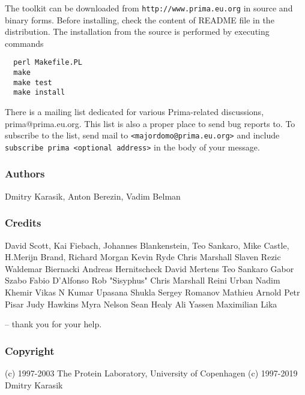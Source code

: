 \documentclass{report}
\begin{document}
The toolkit can be downloaded from \texttt{http://www.prima.eu.org} in
source and binary forms. Before installing, check the content of README file
in the distribution. The installation from the source is performed by
executing commands
\begin{verbatim}
  perl Makefile.PL
  make
  make test
  make install
\end{verbatim}

There is a mailing list dedicated for various Prima-related discussions,
prima@prima.eu.org. This list is also a proper place to send bug reports to.
To subscribe to the list, send mail to \texttt{<majordomo@prima.eu.org>} and
include \texttt{subscribe prima <optional address>} in the body of your message.

\subsubsection{Authors}

Dmitry Karasik,
Anton Berezin,
Vadim Belman

\subsubsection{Credits}

David Scott,
Kai Fiebach,
Johannes Blankenstein,
Teo Sankaro,
Mike Castle,
H.Merijn Brand,
Richard Morgan
Kevin Ryde
Chris Marshall
Slaven Rezic
Waldemar Biernacki
Andreas Hernitscheck
David Mertens
Teo Sankaro
Gabor Szabo
Fabio D'Alfonso
Rob "Sisyphus"
Chris Marshall
Reini Urban
Nadim Khemir
Vikas N Kumar
Upasana Shukla
Sergey Romanov
Mathieu Arnold
Petr Pisar
Judy Hawkins
Myra Nelson
Sean Healy
Ali Yassen
Maximilian Lika

-- thank you for your help.

\subsubsection{Copyright}

(c) 1997-2003 The Protein Laboratory, University of Copenhagen
(c) 1997-2019 Dmitry Karasik
\end{document}
